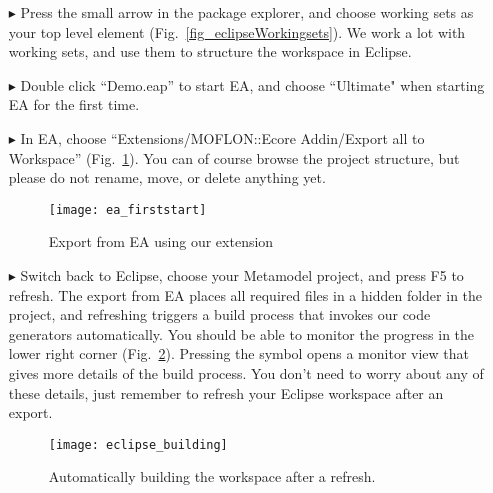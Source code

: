 \begin{enumerate}
\vspace{1cm}



\vspace{1cm}


\FloatBarrier
\item[$\blacktriangleright$] Press the small arrow in the package explorer, and choose working sets as your top level element (Fig.~\ref{fig_eclipseWorkingsets}). We work a lot with working sets, and use them to structure the workspace in Eclipse.

\item[$\blacktriangleright$] Double click ``Demo.eap'' to start EA, and choose ``Ultimate" when starting EA for the first time.

\item[$\blacktriangleright$] In EA, choose ``Extensions/MOFLON::Ecore Addin/Export\- all\- to\- Workspace'' (Fig.~\ref{fig_ea}).
You can of course browse the project structure, but please do not rename, move, or delete anything yet.

\begin{figure}[htbp]
	\centering
  \texttt{[image: ea\_firststart]}
	\caption{Export from EA using our extension} 
	\label{fig_ea} 
\end{figure}
  
\item[$\blacktriangleright$] Switch back to Eclipse, choose your Metamodel project, and press F5 to refresh.
The export from EA places all required files in a hidden folder in the project, and refreshing triggers a build process that invokes our code generators automatically.
You should be able to monitor the progress in the lower right corner (Fig.~\ref{fig_eclipsebuilding}).  
Pressing the symbol opens a monitor view that gives more details of the build process. 
You don't need to worry about any of these details, just remember to refresh your Eclipse workspace after an export.
\begin{figure}[htbp]
	\centering
  \texttt{[image: eclipse\_building]}
	\caption{Automatically building the workspace after a refresh.}
	\label{fig_eclipsebuilding}
\end{figure}

\end{enumerate}
\clearpage
\texHeader
\mbox{}
\pagebreak


